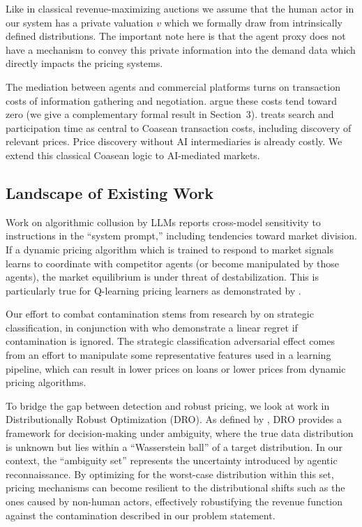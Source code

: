 Like in classical revenue-maximizing auctions \parencite{roughgarden_cs364a_2013} we assume that the human actor in our system has a private valuation $v$ which we formally draw from intrinsically defined distributions. The important note here is that the agent proxy does not have a mechanism to convey this private information into the demand data which directly impacts the pricing systems.

The mediation between agents and commercial platforms turns on transaction costs of information gathering and negotiation. \textcite{shahidi_coasean_2025} argue these costs tend toward zero (we give a complementary formal result in Section~3). \textcite{coase_nature_1937} treats search and participation time as central to Coasean transaction costs, including discovery of relevant prices. Price discovery without AI intermediaries is already costly. We extend this classical Coasean logic to AI-mediated markets.




\subsection{Landscape of Existing Work}

Work on algorithmic collusion by LLMs \parencite{fish_algorithmic_2025} reports cross-model sensitivity to instructions in the ``system prompt,'' including tendencies toward market division. If a dynamic pricing algorithm which is trained to respond to market signals learns to coordinate with competitor agents (or become manipulated by those agents), the market equilibrium is under threat of destabilization. This is particularly true for Q-learning pricing learners as demonstrated by \textcite{calvano_artificial_2018}.

Our effort to combat contamination stems from research by \textcite{hardt_strategic_2015} on strategic classification, in conjunction with \textcite{liu_contextual_2024} who demonstrate a linear regret if contamination is ignored. The strategic classification adversarial effect comes from an effort to manipulate some representative features used in a learning pipeline, which can result in lower prices on loans or lower prices from dynamic pricing algorithms.

To bridge the gap between detection and robust pricing, we look at work in Distributionally Robust Optimization (DRO). As defined by \textcite{kuhn_wasserstein_2024}, DRO provides a framework for decision-making under ambiguity, where the true data distribution is unknown but lies within a ``Wasserstein ball'' of a target distribution. In our context, the ``ambiguity set'' represents the uncertainty introduced by agentic reconnaissance. By optimizing for the worst-case distribution within this set, pricing mechanisms can become resilient to the distributional shifts such as the ones caused by non-human actors, effectively robustifying the revenue function against the contamination described in our problem statement.

